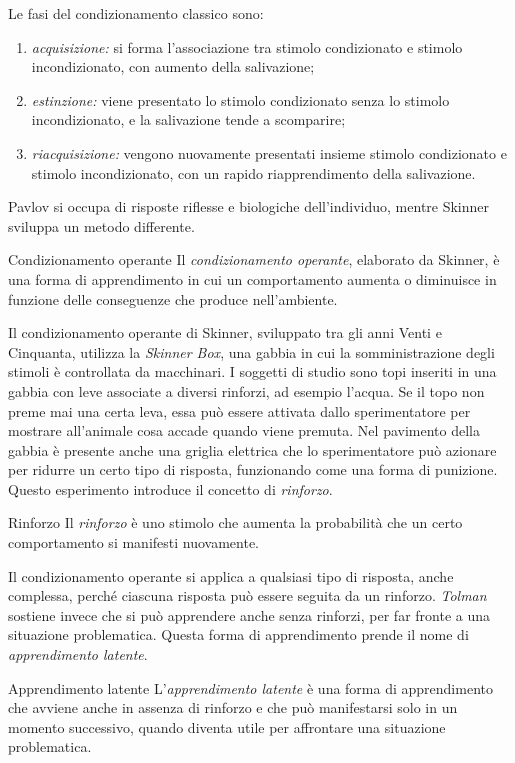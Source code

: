 \documentclass[a4paper]{article}
\begin{document}
Le fasi del condizionamento classico sono:
\begin{enumerate}
    \item \emph{acquisizione:} si forma l'associazione tra stimolo condizionato e stimolo incondizionato, con aumento della salivazione;
    \item \emph{estinzione:} viene presentato lo stimolo condizionato senza lo stimolo incondizionato, e la salivazione tende a scomparire;
    \item \emph{riacquisizione:} vengono nuovamente presentati insieme stimolo condizionato e stimolo incondizionato, con un rapido riapprendimento della salivazione.
\end{enumerate}
Pavlov si occupa di risposte riflesse e biologiche dell'individuo, mentre Skinner sviluppa un metodo differente.
\begin{snippetdefinition}{Condizionamento operante}
    Il \emph{condizionamento operante}, elaborato da Skinner, è una forma di apprendimento in cui un comportamento aumenta o diminuisce in funzione delle conseguenze che produce nell'ambiente.
\end{snippetdefinition}
Il condizionamento operante di Skinner, sviluppato tra gli anni Venti e Cinquanta, utilizza la \emph{Skinner Box}, una gabbia in cui la somministrazione degli stimoli è controllata da macchinari. I soggetti di studio sono topi inseriti in una gabbia con leve associate a diversi rinforzi, ad esempio l'acqua.
Se il topo non preme mai una certa leva, essa può essere attivata dallo sperimentatore per mostrare all'animale cosa accade quando viene premuta. Nel pavimento della gabbia è presente anche una griglia elettrica che lo sperimentatore può azionare per ridurre un certo tipo di risposta, funzionando come una forma di punizione.
Questo esperimento introduce il concetto di \emph{rinforzo}.
\begin{snippetdefinition}{Rinforzo}
    Il \emph{rinforzo} è uno stimolo che aumenta la probabilità che un certo comportamento si manifesti nuovamente.
\end{snippetdefinition}
Il condizionamento operante si applica a qualsiasi tipo di risposta, anche complessa, perché ciascuna risposta può essere seguita da un rinforzo.
\emph{Tolman} sostiene invece che si può apprendere anche senza rinforzi, per far fronte a una situazione problematica. Questa forma di apprendimento prende il nome di \emph{apprendimento latente}.
\begin{snippetdefinition}{Apprendimento latente}
    L'\emph{apprendimento latente} è una forma di apprendimento che avviene anche in assenza di rinforzo e che può manifestarsi solo in un momento successivo, quando diventa utile per affrontare una situazione problematica.
\end{snippetdefinition}
\end{document}
